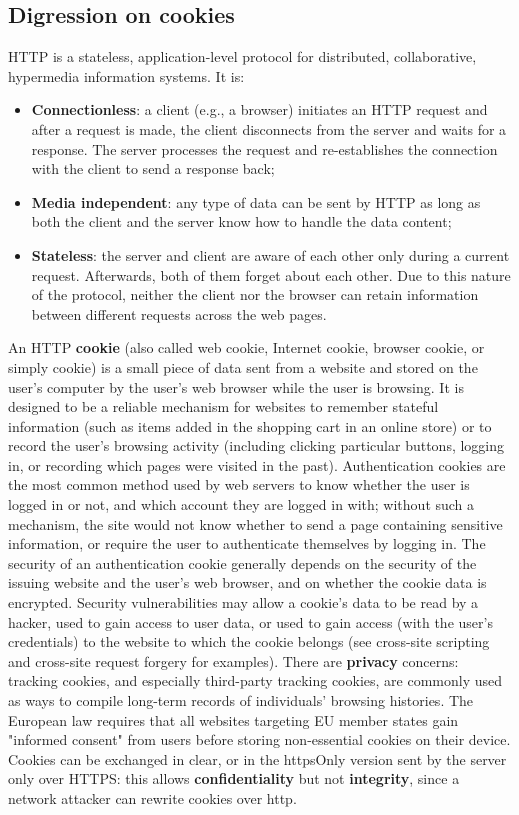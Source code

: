 \documentclass[a4paper, 10pt, titlepage]{article}
\begin{document}
\subsection{Digression on cookies}
HTTP is a stateless, application-level protocol for distributed, collaborative, hypermedia information systems. It is:
\begin{itemize}
\item \textbf{Connectionless}: a client (e.g., a browser) initiates an HTTP request and after a request is made, the client disconnects from the server and waits for a response. The server processes the request and re-establishes the connection with the client to send a response back;
\item \textbf{Media independent}: any type of data can be sent by HTTP as long as both the client and the server know how to handle the data content;
\item \textbf{Stateless}: the server and client are aware of each other only during a current request. Afterwards, both of them forget about each other. Due to this nature of the protocol, neither the client nor the browser can retain information between different requests across the web pages.
\end{itemize}
An HTTP \textbf{cookie} (also called web cookie, Internet cookie, browser cookie, or simply cookie) is a small piece of data sent from a website and stored on the user's computer by the user's web browser while the user is browsing. It is designed to be a reliable mechanism for websites to remember stateful information (such as items added in the shopping cart in an online store) or to record the user's browsing activity (including clicking particular buttons, logging in, or recording which pages were visited in the past). Authentication cookies are the most common method used by web servers to know whether the user is logged in or not, and which account they are logged in with; without such a mechanism, the site would not know whether to send a page containing sensitive information, or require the user to authenticate themselves by logging in. The security of an authentication cookie generally depends on the security of the issuing website and the user's web browser, and on whether the cookie data is encrypted. Security vulnerabilities may allow a cookie's data to be read by a hacker, used to gain access to user data, or used to gain access (with the user's credentials) to the website to which the cookie belongs (see cross-site scripting and cross-site request forgery for examples). There are \textbf{privacy} concerns: tracking cookies, and especially third-party tracking cookies, are commonly used as ways to compile long-term records of individuals' browsing histories. The European law requires that all websites targeting EU member states gain "informed consent" from users before storing non-essential cookies on their device. \medskip\\
Cookies can be exchanged in clear, or in the httpsOnly version sent by the server only over HTTPS: this allows \textbf{confidentiality} but not \textbf{integrity}, since a network attacker can rewrite cookies over http.
\end{document}
